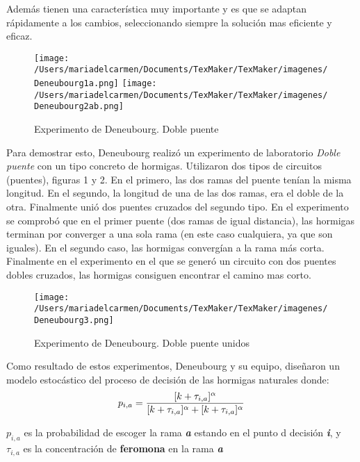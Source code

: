 \documentclass[10pt,a4paper]{article}
\begin{document}
Además tienen una característica muy importante y es que se adaptan rápidamente a los cambios, seleccionando siempre la solución mas eficiente y eficaz.



\begin{figure}
\centering
\texttt{[image: /Users/mariadelcarmen/Documents/TexMaker/TexMaker/imagenes/Deneubourg1a.png]} 
\texttt{[image: /Users/mariadelcarmen/Documents/TexMaker/TexMaker/imagenes/Deneubourg2ab.png]} 

\caption{Experimento de Deneubourg. Doble puente }\label{fig:Deneubourg}
\end{figure}


Para demostrar esto, Deneubourg \cite{ref1} realizó un experimento de laboratorio \emph{Doble puente} con un tipo concreto de hormigas. Utilizaron dos tipos de circuitos (puentes), figuras 1 y 2. En el primero, las dos ramas del puente tenían la misma longitud. En el segundo, la longitud de una de las dos ramas, era el doble de la otra. Finalmente unió dos puentes cruzados del segundo tipo.
En el experimento se comprobó que en el primer puente (dos ramas de igual distancia), las hormigas terminan por converger a una sola rama (en este caso cualquiera, ya que son iguales).
En el segundo caso, las hormigas convergían a la rama más corta.
Finalmente en el experimento en el que se generó un circuito con dos puentes dobles cruzados, las hormigas consiguen encontrar el camino mas corto.

\begin{figure}
\centering
\texttt{[image: /Users/mariadelcarmen/Documents/TexMaker/TexMaker/imagenes/Deneubourg3.png]} 

\caption{Experimento de Deneubourg. Doble puente unidos }\label{fig:DeneubourgDoblePuente}
\end{figure}

Como resultado de estos experimentos, Deneubourg y su equipo, diseñaron un modelo estocástico del proceso de decisión de las hormigas naturales donde:\\

\begin{equation}
p_{i,a}=\frac{[k+\tau_{i,a}]^{\alpha}}{[k+\tau_{i,a}]^{\alpha}+[k+\tau_{i,a}]^{\alpha}} \\
\end{equation}


\begin{center}
\begin{description}
$p_{i,a}$ es la probabilidad de escoger la rama \emph{\textbf{a}} estando en el punto d decisión \emph{\textbf{i}}, y \\
$\tau_{i,a}$ es la concentración de \textbf{feromona} en la rama \emph{\textbf{a}}
\end{description}
\end{center}
\end{document}
